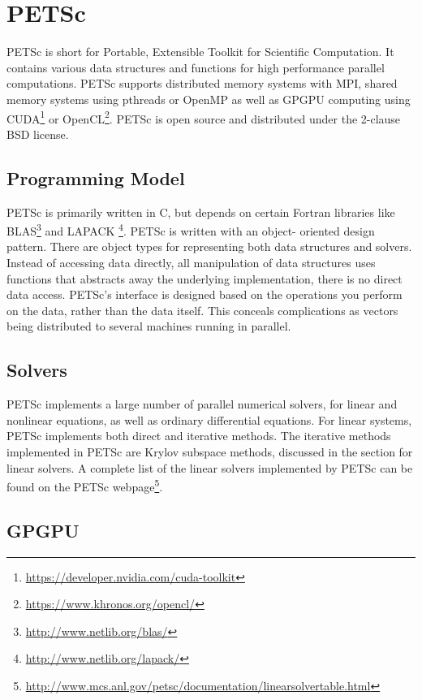 \section{PETSc}

PETSc is short for Portable, Extensible Toolkit for Scientific Computation. 
It contains various data structures and functions for 
high performance parallel computations. PETSc supports distributed 
memory systems with MPI, shared memory systems using pthreads or OpenMP as well 
as GPGPU computing using CUDA\footnote{\url{https://developer.nvidia.com/cuda-toolkit}} 
or OpenCL\footnote{\url{https://www.khronos.org/opencl/}}. PETSc is open source and distributed 
under the 2-clause BSD license\cite{petsc-web-page}.

\subsection{Programming Model}

PETSc is primarily written in C, but depends on certain Fortran libraries like 
BLAS\footnote{\url{http://www.netlib.org/blas/}} and LAPACK
\footnote{\url{http://www.netlib.org/lapack/}}. PETSc is written with an object-
oriented design pattern. There are object types for representing both data structures 
and solvers. Instead of accessing data directly, all manipulation of data structures 
uses functions that abstracts away the underlying implementation, there is no direct 
data access. PETSc's interface is designed based on the operations you perform on 
the data, rather than the data itself. This conceals complications as vectors being 
distributed to several machines running in parallel.

\subsection{Solvers}

PETSc implements a large number of parallel numerical solvers, for linear and 
nonlinear equations, as well as ordinary differential equations. For linear systems, 
PETSc implements both direct and iterative methods. The iterative methods implemented 
in PETSc are Krylov subspace methods, discussed in the section for linear solvers.
A complete list of the linear solvers implemented by PETSc can be found on the 
PETSc webpage\footnote{\url{http://www.mcs.anl.gov/petsc/documentation/linearsolvertable.html}}.

\subsection{GPGPU}

